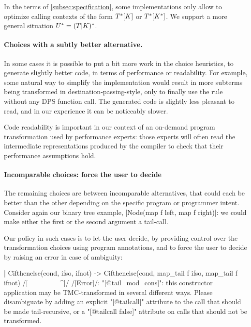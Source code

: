 In the terms of \cref{subsec:specification}, some implementations only allow to optimize calling contexts of the form $\datalangTailCtx{[\datalangConsFrame]}$ or $\datalangTailCtx{[\datalangConsCtx]}$. We support a more general situation $\datalangTMCCtx = (\datalangTailFrame | \datalangConsFrame)^{*}$.

\paragraph{Choices with a subtly better alternative.} In some cases it
is possible to put a bit more work in the choice heuristics, to
generate slightly better code, in terms of performance or
readability. For example, some natural way to simplify the
implementation would result in more subterms being transformed in
destination-passing-style, only to finally use the
 rule without any DPS function call. The generated
code is slightly less pleasant to read, and in our experience it can
be noticeably slower.

Code readability is important in our context of an on-demand program
transformation used by performance experts: those experts will often
read the intermediate representations produced by the compiler to
check that their performance assumptions hold.

\paragraph{Incomparable choices: force the user to decide} The
remaining choices are between incomparable alternatives, that could
each be better than the other depending on the specific program or
programmer intent. Consider again our binary tree example,
\ocaml|Node(map f left, map f right)|: we could make either the first
or the second argument a tail-call.

Our policy in such cases is to let the user decide, by providing
control over the transformation choices using \ocaml{[@tailcall]}
program annotations, and to force the user to decide by raising an
error in case of ambiguity:
\begin{Ocaml}
  | Cifthenelse(cond, ifso, ifnot) ->
      Cifthenelse(cond, map_tail f ifso, map_tail f ifnot)
      /[^^^^^^^^^^^^^^^^^^^^^^^^^^^^^^^^^^^^^^^^^^^^^^^^^^^^]/
/[Error]/: "[@tail_mod_cons]": this constructor application may be TMC-transformed
       in several different ways. Please disambiguate by adding an explicit
       "[@tailcall]" attribute to the call that should be made tail-recursive,
       or a "[@tailcall false]" attribute on calls that should not be
       transformed.
\end{Ocaml}

